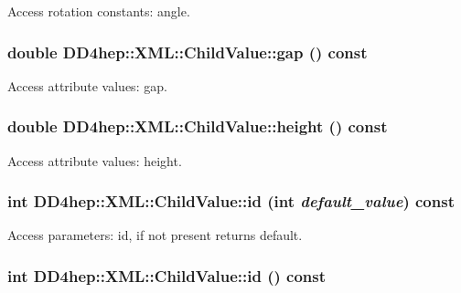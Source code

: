 Access rotation constants: angle. \hypertarget{struct_d_d4hep_1_1_x_m_l_1_1_child_value_a6d4360815f5a9d7cf21ce0c4df0bc7e6}{
\subsubsection[{gap}]{\setlength{\rightskip}{0pt plus 5cm}double DD4hep::XML::ChildValue::gap () const}}
\label{struct_d_d4hep_1_1_x_m_l_1_1_child_value_a6d4360815f5a9d7cf21ce0c4df0bc7e6}


Access attribute values: gap. \hypertarget{struct_d_d4hep_1_1_x_m_l_1_1_child_value_a33bfe097d6727dd33e1b081f9695bcb3}{
\subsubsection[{height}]{\setlength{\rightskip}{0pt plus 5cm}double DD4hep::XML::ChildValue::height () const}}
\label{struct_d_d4hep_1_1_x_m_l_1_1_child_value_a33bfe097d6727dd33e1b081f9695bcb3}


Access attribute values: height. \hypertarget{struct_d_d4hep_1_1_x_m_l_1_1_child_value_a782a7165d038e4b840d5f94b36112e5c}{
\subsubsection[{id}]{\setlength{\rightskip}{0pt plus 5cm}int DD4hep::XML::ChildValue::id (int {\em default\_\-value}) const}}
\label{struct_d_d4hep_1_1_x_m_l_1_1_child_value_a782a7165d038e4b840d5f94b36112e5c}


Access parameters: id, if not present returns default. \hypertarget{struct_d_d4hep_1_1_x_m_l_1_1_child_value_a78728826dc0038a5336ad45a39616d64}{
\subsubsection[{id}]{\setlength{\rightskip}{0pt plus 5cm}int DD4hep::XML::ChildValue::id () const}}
\label{struct_d_d4hep_1_1_x_m_l_1_1_child_value_a78728826dc0038a5336ad45a39616d64}


